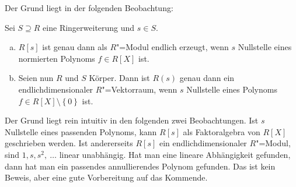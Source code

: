 \documentclass[ngerman, 11pt, a4paper, twoside, abstracton]{scrbook}
\begin{document}
Der Grund liegt in der folgenden Beobachtung:

\begin{pattern}
  Sei $S\supseteq R$ eine Ringerweiterung und $s\in S$.

  \begin{enumerate}[(a)]
    \item $R\left[ s \right]$ ist genau dann als $R$"=Modul endlich erzeugt, wenn $s$ Nullstelle eines normierten Polynoms $f\in R\left[ X \right]$ ist.
    \item Seien nun $R$ und $S$ Körper. Dann ist $R\left( s \right)$ genau dann ein endlichdimensionaler $R$"=Vektorraum, wenn $s$ Nullstelle eines Polynoms $f\in R\left[ X \right]\setminus\left\{ 0 \right\}$ ist.
  \end{enumerate}

\end{pattern}

Der Grund liegt rein intuitiv in den folgenden zwei Beobachtungen. Ist $s$ Nullstelle eines passenden Polynoms, kann $R\left[ s \right]$ als Faktoralgebra von $R\left[ X \right]$ geschrieben werden. Ist andererseits $R\left[ s \right]$ ein endlichdimensionaler $R$"=Modul, sind $1, s, s^2,\ \dots$ linear unabhängig. Hat man eine lineare Abhängigkeit gefunden, dann hat man ein passendes annullierendes Polynom gefunden. Das ist kein Beweis, aber eine gute Vorbereitung auf das Kommende.
\end{document}
